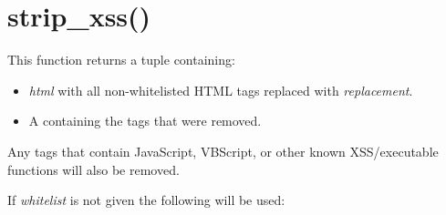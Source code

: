 \documentclass[letterpaper,10pt,english]{sphinxmanual}
\begin{document}
\chapter{strip\_xss()}
\label{index:strip-xss}

\begin{fulllineitems}
\label{index:htmltag.strip_xss}
This function returns a tuple containing:
\begin{itemize}
\item {} 
\emph{html} with all non-whitelisted HTML tags replaced with \emph{replacement}.

\item {} 
A  containing the tags that were removed.

\end{itemize}

Any tags that contain JavaScript, VBScript, or other known XSS/executable
functions will also be removed.

If \emph{whitelist} is not given the following will be used:


\end{fulllineitems}
\end{document}
